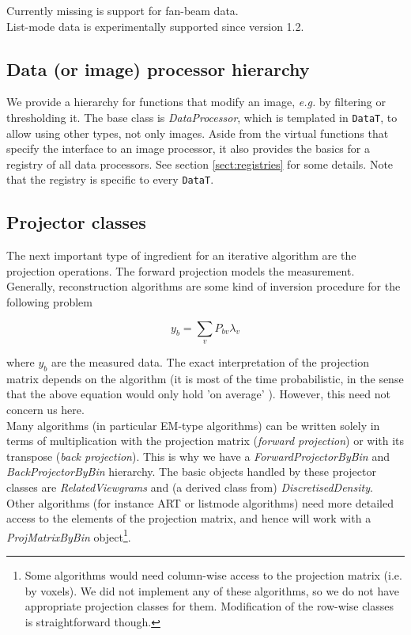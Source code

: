 \documentclass{article}
\begin{document}
Currently missing is support for fan-beam data.\\
List-mode data is experimentally supported since version 1.2.

\subsection{
Data (or image) processor hierarchy}

We provide a hierarchy for functions that modify an image, \textit{e.g.} by 
filtering or thresholding it. The base class is \textit{DataProcessor},
which is templated in \texttt{DataT}, to allow using other types, not
only images.
Aside from the virtual functions that specify the interface to 
an image processor, it also provides the basics for a registry 
of all data processors. See section \ref{sect:registries} for some details.
Note that the registry is specific to every \texttt{DataT}.

\subsection{
Projector classes}

The next important type of ingredient for an iterative algorithm 
are the projection operations. The forward projection models 
the measurement. Generally, reconstruction algorithms are some 
kind of inversion procedure for the following problem


\[y_{b} =\sum\limits_{v}P_{bv} \lambda _{v}  \]


where $y_b$ are the measured data. The exact interpretation 
of the projection matrix depends on the algorithm (it is most 
of the time probabilistic, in the sense that the above equation 
would only hold 'on average' ). However, this need not concern 
us here.\\
Many algorithms (in particular EM-type algorithms) can be written 
solely in terms of multiplication with the projection matrix 
(\textit{forward projection}) or with its transpose (\textit{back projection}). 
This is why we have a \textit{ForwardProjectorByBin} and \textit{BackProjectorByBin} 
hierarchy. The basic objects handled by these projector classes 
are \textit{RelatedViewgrams} and (a derived class from) \textit{DiscretisedDensity}. 
Other algorithms (for instance ART or listmode algorithms) need 
more detailed access to the elements of the projection matrix, 
and hence will work with a \textit{ProjMatrixByBin} object\footnote{{\small Some 
algorithms would need column-wise access to the projection matrix 
(i.e. by voxels). We did not implement any of these algorithms, 
so we do not have appropriate projection classes for them. Modification 
of the row-wise classes is straightforward though.}}. 
\end{document}
